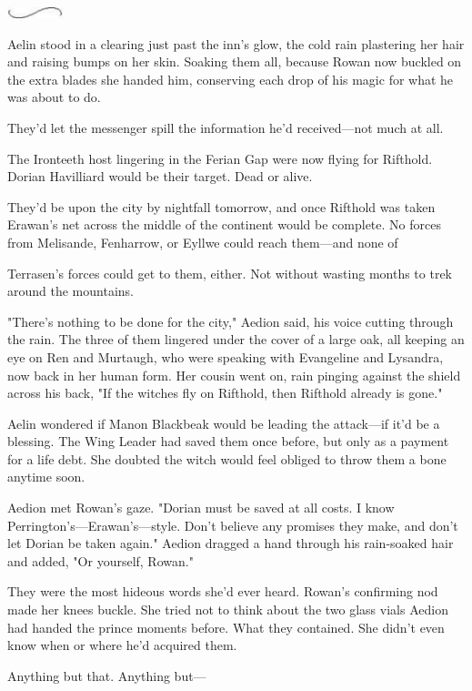 \includegraphics[width=0.65in,height=0.13in]{images/seperator}

Aelin stood in a clearing just past the inn's glow, the cold rain plastering her hair and raising bumps on her skin. Soaking them all, because Rowan now buckled on the extra blades she handed him, conserving each drop of his magic for what he was about to do.

They'd let the messenger spill the information he'd received---not much at all.

The Ironteeth host lingering in the Ferian Gap were now flying for Rifthold. Dorian Havilliard would be their target. Dead or alive.

They'd be upon the city by nightfall tomorrow, and once Rifthold was taken  Erawan's net across the middle of the continent would be complete. No forces from Melisande, Fenharrow, or Eyllwe could reach them---and none of

Terrasen's forces could get to them, either. Not without wasting months to trek around the mountains.

"There's nothing to be done for the city," Aedion said, his voice cutting through the rain. The three of them lingered under the cover of a large oak, all keeping an eye on Ren and Murtaugh, who were speaking with Evangeline and Lysandra, now back in her human form. Her cousin went on, rain pinging against the shield across his back, "If the witches fly on Rifthold, then Rifthold already is gone."

Aelin wondered if Manon Blackbeak would be leading the attack---if it'd be a blessing. The Wing Leader had saved them once before, but only as a payment for a life debt. She doubted the witch would feel obliged to throw them a bone anytime soon.

Aedion met Rowan's gaze. "Dorian must be saved at all costs. I know Perrington's---Erawan's---style. Don't believe any promises they make, and don't let Dorian be taken again." Aedion dragged a hand through his rain-soaked hair and added, "Or yourself, Rowan."

They were the most hideous words she'd ever heard. Rowan's confirming nod made her knees buckle. She tried not to think about the two glass vials Aedion had handed the prince moments before. What they contained. She didn't even know when or where he'd acquired them.

Anything but that. Anything but---

